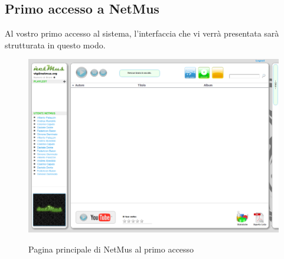 \subsection{Primo accesso a NetMus}

Al vostro primo accesso al sistema, l'interfaccia che vi verr\`a presentata
sar\`a strutturata in questo modo.\\
\begin{figure}[htbp]
  \centering
  \includegraphics[width=15cm]{img/MU/profile_blank.png}\\
\caption{Pagina principale di NetMus al primo accesso}
\end{figure}

